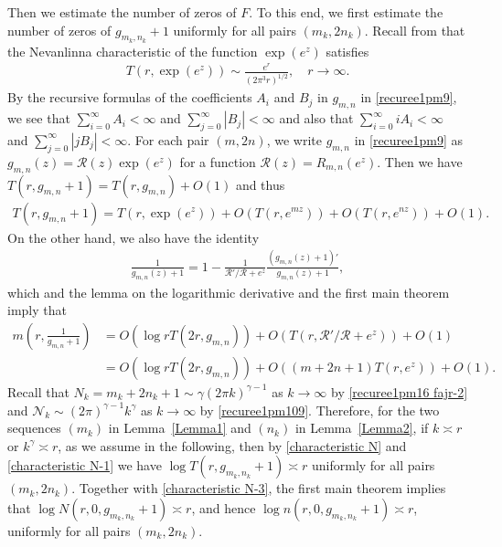 \documentclass[12pt]{amsart}
\numberwithin{equation}{section}
\begin{document}
Then we estimate the number of zeros of $F$. To this end, we first estimate the number of zeros of $g_{m_k,n_k}+1$ uniformly for all pairs $(m_k,2n_k)$. Recall from \cite[p.~7]{Hayman1964Meromorphic} that the Nevanlinna characteristic of the function $\exp(e^z)$ satisfies
\begin{equation}\label{characteristic N}
\begin{split}
T(r,\exp(e^z))\sim\frac{e^r}{(2\pi^3r)^{1/2}}, \quad r\to\infty.
\end{split}
\end{equation}
By the recursive formulas of the coefficients $A_i$ and $B_j$ in $g_{m,n}$ in \eqref{recuree1pm9}, we see that $\sum_{i=0}^{\infty}A_i<\infty$ and $\sum_{j=0}^{\infty}|B_j|<\infty$ and also that $\sum_{i=0}^{\infty}iA_i<\infty$ and $\sum_{j=0}^{\infty}|jB_j|<\infty$. For each pair $(m,2n)$, we write $g_{m,n}$ in \eqref{recuree1pm9} as $g_{m,n}(z)=\mathcal{R}(z)\exp(e^z)$ for a function $\mathcal{R}(z)=R_{m,n}(e^z)$. Then we have $T(r,g_{m,n}+1)=T(r,g_{m,n})+O(1)$ and thus
\begin{equation}\label{characteristic N-1}
\begin{split}
T(r,g_{m,n}+1)=T(r,\exp(e^z))+O(T(r,e^{mz}))+O(T(r,e^{nz}))+O(1).
\end{split}
\end{equation}
On the other hand, we also have the identity
\begin{equation*}%
\begin{split}
\frac{1}{g_{m,n}(z)+1}=1-\frac{1}{\mathcal{R}'/\mathcal{R}+e^z}\frac{(g_{m,n}(z)+1)'}{g_{m,n}(z)+1},
\end{split}
\end{equation*}
which and the lemma on the logarithmic derivative and the first main theorem imply that
\begin{equation}\label{characteristic N-3}
\begin{split}
m\left(r,\frac{1}{g_{m,n}+1}\right)&=O(\log rT(2r,g_{m,n}))+O\left(T(r,\mathcal{R}'/\mathcal{R}+e^z)\right)+O(1)\\
&=O(\log rT(2r,g_{m,n}))+O((m+2n+1)T(r,e^{z}))+O(1).
\end{split}
\end{equation}
Recall that $N_k=m_k+2n_k+1\sim \gamma(2\pi k)^{\gamma-1}$ as $k\to\infty$ by \eqref{recuree1pm16  fajr-2} and $\mathcal{N}_k\sim (2\pi)^{\gamma-1}k^{\gamma}$ as $k\to\infty$ by \eqref{recuree1pm109}. Therefore, for the two sequences $(m_k)$ in Lemma~\ref{Lemma1} and $(n_k)$ in Lemma~\ref{Lemma2}, if $k\asymp r$ or $k^{\gamma}\asymp r$, as we assume in the following, then by \eqref{characteristic N} and \eqref{characteristic N-1} we have $\log T(r,g_{m_k,n_k}+1)\asymp r$ uniformly for all pairs $(m_k,2n_k)$. Together with \eqref{characteristic N-3}, the first main theorem implies that $\log N(r,0,g_{m_k,n_k}+1)\asymp r$, and hence $\log n(r,0,g_{m_k,n_k}+1)\asymp r$, uniformly for all pairs $(m_k,2n_k)$.
\end{document}
